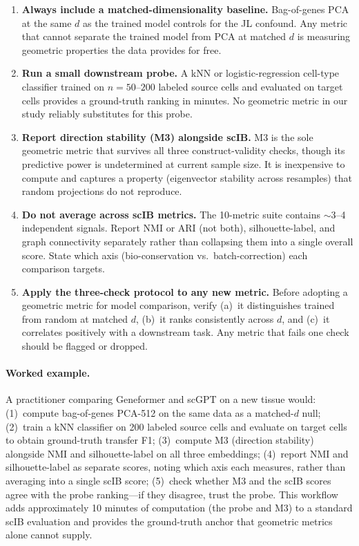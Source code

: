 \documentclass[10pt,letterpaper]{article}
\begin{document}
\begin{enumerate}
\item \textbf{Always include a matched-dimensionality baseline.} Bag-of-genes PCA at the same $d$ as the trained model controls for the JL confound. Any metric that cannot separate the trained model from PCA at matched $d$ is measuring geometric properties the data provides for free.

\item \textbf{Run a small downstream probe.} A kNN or logistic-regression cell-type classifier trained on $n = 50$--$200$ labeled source cells and evaluated on target cells provides a ground-truth ranking in minutes. No geometric metric in our study reliably substitutes for this probe.

\item \textbf{Report direction stability (M3) alongside scIB.} M3 is the sole geometric metric that survives all three construct-validity checks, though its predictive power is undetermined at current sample size. It is inexpensive to compute and captures a property (eigenvector stability across resamples) that random projections do not reproduce.

\item \textbf{Do not average across scIB metrics.} The 10-metric suite contains $\sim$3--4 independent signals. Report NMI or ARI (not both), silhouette-label, and graph connectivity separately rather than collapsing them into a single overall score. State which axis (bio-conservation vs.\ batch-correction) each comparison targets.

\item \textbf{Apply the three-check protocol to any new metric.} Before adopting a geometric metric for model comparison, verify (a)~it distinguishes trained from random at matched $d$, (b)~it ranks consistently across $d$, and (c)~it correlates positively with a downstream task. Any metric that fails one check should be flagged or dropped.
\end{enumerate}

\paragraph{Worked example.} A practitioner comparing Geneformer and scGPT on a new tissue would: (1)~compute bag-of-genes PCA-512 on the same data as a matched-$d$ null; (2)~train a kNN classifier on 200 labeled source cells and evaluate on target cells to obtain ground-truth transfer F1; (3)~compute M3 (direction stability) alongside NMI and silhouette-label on all three embeddings; (4)~report NMI and silhouette-label as separate scores, noting which axis each measures, rather than averaging into a single scIB score; (5)~check whether M3 and the scIB scores agree with the probe ranking---if they disagree, trust the probe. This workflow adds approximately 10 minutes of computation (the probe and M3) to a standard scIB evaluation and provides the ground-truth anchor that geometric metrics alone cannot supply.
\end{document}
